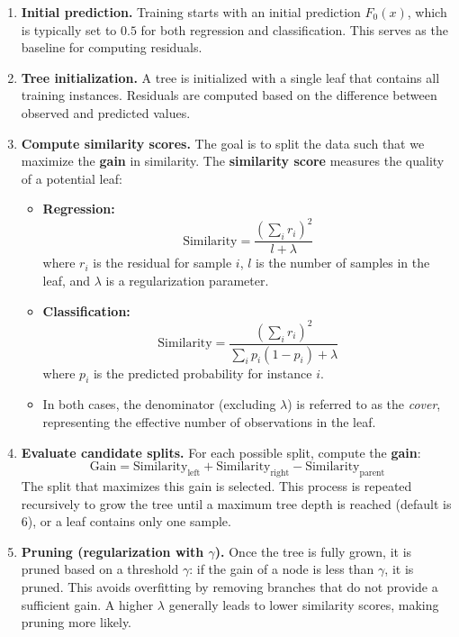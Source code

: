\bigskip

\begin{enumerate}
    \item \textbf{Initial prediction.}  
    Training starts with an initial prediction $F_0(x)$, which is typically set to $0.5$ for both regression and classification. This serves as the baseline for computing residuals.

    \item \textbf{Tree initialization.}  
    A tree is initialized with a single leaf that contains all training instances. Residuals are computed based on the difference between observed and predicted values.

    \item \textbf{Compute similarity scores.}  
    The goal is to split the data such that we maximize the \textbf{gain} in similarity. The \textbf{similarity score} measures the quality of a potential leaf:
    \begin{itemize}
        \item \textbf{Regression:}
        \[
        \text{Similarity} = \frac{\left( \sum_i r_i \right)^2}{l + \lambda}
        \]
        where $r_i$ is the residual for sample $i$, $l$ is the number of samples in the leaf, and $\lambda$ is a regularization parameter.
        
        \item \textbf{Classification:}
        \[
        \text{Similarity} = \frac{\left( \sum_i r_i \right)^2}{\sum_i p_i (1 - p_i) + \lambda}
        \]
        where $p_i$ is the predicted probability for instance $i$.

        \item In both cases, the denominator (excluding $\lambda$) is referred to as the \textit{cover}, representing the effective number of observations in the leaf.
    \end{itemize}

    \item \textbf{Evaluate candidate splits.}
    For each possible split, compute the \textbf{gain}:
    \[
    \text{Gain} = \text{Similarity}_{\text{left}} + \text{Similarity}_{\text{right}} - \text{Similarity}_{\text{parent}}
    \]
    The split that maximizes this gain is selected. This process is repeated recursively to grow the tree until a maximum tree depth is reached (default is 6), or a leaf contains only one sample.

    \item \textbf{Pruning (regularization with $\gamma$).}  
    Once the tree is fully grown, it is pruned based on a threshold $\gamma$: if the gain of a node is less than $\gamma$, it is pruned. This avoids overfitting by removing branches that do not provide a sufficient gain.  
    A higher $\lambda$ generally leads to lower similarity scores, making pruning more likely.


\end{enumerate}
